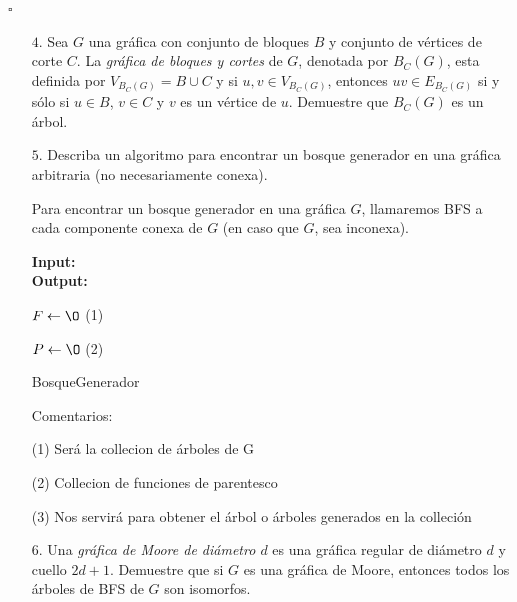\documentclass{article}
\begin{document}
\hfill $\square$
\begin{enumerate}
\item[$4$.] Sea $G$ una gr\'afica con conjunto de bloques $B$ y conjunto de
  v\'ertices de corte $C$.   La {\em gr\'afica de bloques y cortes} de $G$,
  denotada por $B_C (G)$, esta definida por $V_{B_C (G)} = B \cup C$ y
  si $u, v \in V_{B_C (G)}$, entonces $uv \in E_{B_C (G)}$ si y s\'olo si
  $u \in B$, $v \in C$ y $v$ es un v\'ertice de $u$.   Demuestre que
  $B_C (G)$ es un \'arbol.
  
\item[$5$.] Describa un algoritmo para encontrar un bosque generador en una
  gr\'afica arbitraria (no necesariamente conexa).

  Para encontrar un bosque generador en una gráfica $G$, llamaremos BFS a cada componente conexa de $G$ (en caso que $G$, sea inconexa).\\
  
  \begin{algorithm}[H]
      \textbf{Input:} \\
      \textbf{Output:} 
      
      $F \leftarrow \O$  (1)
      
      $P \leftarrow \O$  (2)
      
      \caption{BosqueGenerador}
  \end{algorithm}

  Comentarios:

  (1) Será la collecion de árboles de G

  (2) Collecion de funciones de parentesco

  (3) Nos servirá para obtener el árbol o árboles generados en la colleción
  
\item[$6$.] Una {\em gr\'afica de Moore de di\'ametro $d$} es una gr\'afica
  regular de di\'ametro $d$ y cuello $2d+1$.   Demuestre que si $G$ es
  una gr\'afica de Moore, entonces todos los \'arboles de BFS de $G$
  son isomorfos.

\end{enumerate}
\end{document}
